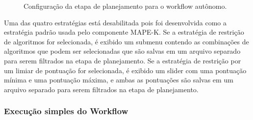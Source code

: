 \documentclass[portugues]{ic-tese}
\begin{document}
\begin{figure}[H]
    \centering
    \caption{Configuração da etapa de planejamento para o workflow autônomo.}
    \label{fig:configPlanejamento}
\end{figure}

Uma das quatro estratégias está desabilitada pois foi desenvolvida como a estratégia padrão usada pelo componente MAPE-K. Se a estratégia de restrição de algoritmos for selecionada, é exibido um submenu contendo as combinações de algoritmos que podem ser selecionadas que são salvas em um arquivo separado para serem filtrados na etapa de planejamento. Se a estratégia de restrição por um limiar de pontuação for selecionada, é exibido um slider com uma pontuação mínima e uma pontuação máxima, e ambas as pontuações são salvas em um arquivo separado para serem filtrados na etapa de planejamento.

\subsubsection{Execução simples do Workflow}
\end{document}
